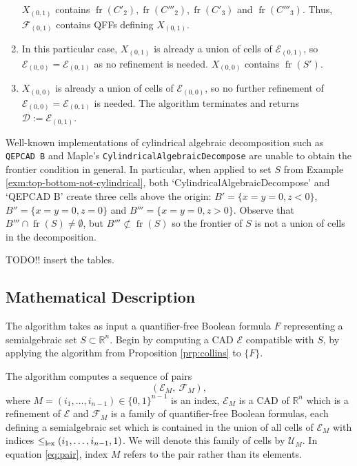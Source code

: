 \documentclass[
]{book}
\theoremstyle{definition}
\theoremstyle{definition}
\theoremstyle{definition}
\theoremstyle{definition}
\theoremstyle{remark}
\begin{document}
\begin{enumerate}
  \(X_{(0,1)}\) contains \({\operatorname{fr} \left( C'_2 \right)}, {\operatorname{fr} \left( C'''_2 \right)}, {\operatorname{fr} \left( C'_3 \right)}\) and \({\operatorname{fr} \left( C'''_3 \right)}\). Thus, \(\mathcal{F}_{(0,1)}\) contains QFFs defining \(X_{(0,1)}\).
\item
  In this particular case, \(X_{(0,1)}\) is already a union of cells of \(\mathcal{E}_{(0,1)}\), so \(\mathcal{E}_{(0,0)} = \mathcal{E}_{(0,1)}\) as no refinement is needed.
  \(X_{(0,0)}\) contains \({\operatorname{fr} \left( S' \right)}\).
\item
  \(X_{(0,0)}\) is already a union of cells of \(\mathcal{E}_{(0,0)}\), so no further refinement of \(\mathcal{E}_{(0,0)} = \mathcal{E}_{(0,1)}\) is needed. The algorithm terminates and returns \(\mathcal{D} := \mathcal{E}_{(0,1)}\).
\end{enumerate}

Well-known implementations of cylindrical algebraic decomposition such as \texttt{QEPCAD\ B} \citep{brownQepcad} and Maple's \texttt{CylindricalAlgebraicDecompose} \citep{chen2014} are unable to obtain the frontier condition in general. In particular, when applied to set \(S\) from Example \ref{exm:top-bottom-not-cylindrical}, both `CylindricalAlgebraicDecompose' and `QEPCAD B' create three cells above the origin: \(B' = \{ x = y = 0, z < 0\}\), \(B'' = \{ x = y = 0, z = 0\}\) and \(B''' = \{ x = y = 0, z > 0\}\). Observe that \(B''' \cap {\operatorname{fr} \left( S \right)} \ne \emptyset\), but \(B''' \not \subset {\operatorname{fr} \left( S \right)}\) so the frontier of \(S\) is not a union of cells in the decomposition.

TODO!! insert the tables.

\hypertarget{mathematical-description}{%
\subsection{Mathematical Description}\label{mathematical-description}}

The algorithm takes as input a quantifier-free Boolean formula \(F\) representing a semialgebraic set \(S \subset \mathbb{R}^n\). Begin by computing a CAD \(\mathcal{E}\) compatible with \(S\), by applying the algorithm from Proposition \ref{prp:collins} to \(\{ F \}\).

The algorithm computes a sequence of pairs
\begin{equation}
({\mathcal E}_M,\ \mathcal{F}_M),
\label{eq:pair}
\end{equation}
where \(M = (i_1,\ldots,i_{n-1}) \in \{0,1\}^{n-1}\) is an index, \(\mathcal{E}_M\) is a CAD of \(\mathbb{R}^n\) which is a refinement of \(\mathcal{E}\) and \(\mathcal{F}_M\) is a family of quantifier-free Boolean formulas, each defining a semialgebraic set which is contained in the union of all cells of \({\mathcal E}_M\) with indices \(\le_{\rm{lex}}(i_1,\ldots,i_{n-1},1)\). We will denote this family of cells by \(\mathcal{U}_M\).
In equation \eqref{eq:pair}, index \(M\) refers to the pair rather than its elements.
\end{document}
